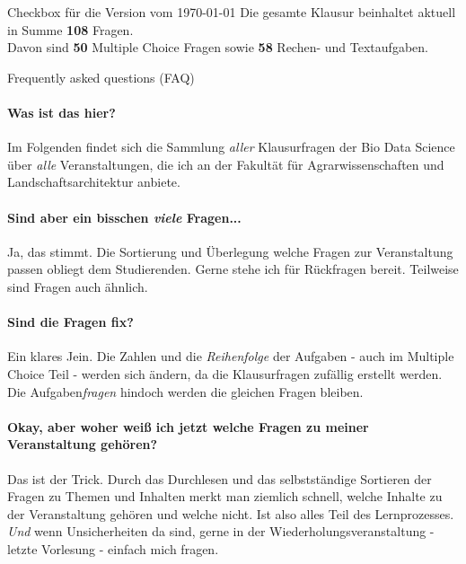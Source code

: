 \documentclass[a4paper, 10pt]{scrartcl}\usepackage[]{graphicx}\usepackage[]{color}
\begin{document}
\begin{graybox}{Checkbox für die Version vom \today}
  \Large Die gesamte Klausur beinhaltet aktuell in Summe
  \textbf{108}
  Fragen.\\[1Ex]
  Davon sind \textbf{50} Multiple
  Choice Fragen sowie \textbf{58} Rechen- und
  Textaufgaben.
\end{graybox}

\vfill

\begin{takehomebox}{Frequently asked questions (FAQ)}
  \paragraph{Was ist das hier?} Im Folgenden findet sich die Sammlung
  \textit{aller} Klausurfragen der Bio Data Science über \textit{alle}
  Veranstaltungen, die ich an der Fakultät für Agrarwissenschaften und
  Landschaftsarchitektur anbiete.
  \vspace{1Ex}
  \paragraph{Sind aber ein bisschen \textit{viele} Fragen...} Ja, das
  stimmt. Die Sortierung und Überlegung welche Fragen zur Veranstaltung
  passen obliegt dem Studierenden. Gerne stehe ich für Rückfragen
  bereit. Teilweise sind Fragen auch ähnlich.
  \vspace{1Ex}
  \paragraph{Sind die Fragen fix?} Ein klares Jein. Die Zahlen und die
  \textit{Reihenfolge} der Aufgaben - auch im Multiple Choice Teil - werden
  sich ändern, da die Klausurfragen zufällig erstellt werden. Die
  Aufgaben\textit{fragen} hindoch werden die gleichen Fragen bleiben.
  \vspace{1Ex}
  \paragraph{Okay, aber woher weiß ich jetzt welche Fragen zu meiner
    Veranstaltung gehören?} Das ist der Trick. Durch das Durchlesen und das
  selbstständige Sortieren der Fragen zu Themen und Inhalten merkt man
  ziemlich schnell, welche Inhalte zu der Veranstaltung gehören und welche
  nicht. Ist also alles Teil des Lernprozesses. \textit{Und} wenn
  Unsicherheiten da sind, gerne in der Wiederholungsveranstaltung - letzte
  Vorlesung - einfach mich fragen.
  \vspace{1Ex}

\end{takehomebox}
\end{document}
